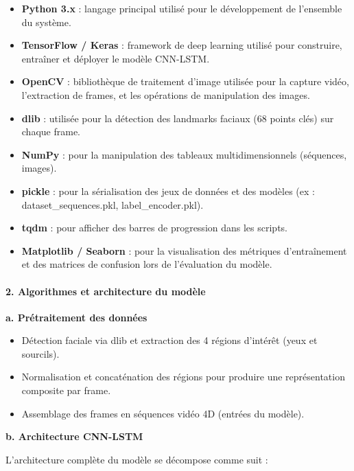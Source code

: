 \documentclass[
]{article}
\begin{document}
\begin{itemize}
\item
  \textbf{Python 3.x} : langage principal utilisé pour le développement de l'ensemble du système.
\item
  \textbf{TensorFlow / Keras} : framework de deep learning utilisé pour construire, entraîner et déployer le modèle CNN-LSTM.
\item
  \textbf{OpenCV} : bibliothèque de traitement d'image utilisée pour la capture vidéo, l'extraction de frames, et les opérations de manipulation des images.
\item
  \textbf{dlib} : utilisée pour la détection des landmarks faciaux (68 points clés) sur chaque frame.
\item
  \textbf{NumPy} : pour la manipulation des tableaux multidimensionnels (séquences, images).
\item
  \textbf{pickle} : pour la sérialisation des jeux de données et des modèles (ex : dataset\_sequences.pkl, label\_encoder.pkl).
\item
  \textbf{tqdm} : pour afficher des barres de progression dans les scripts.
\item
  \textbf{Matplotlib / Seaborn} : pour la visualisation des métriques d'entraînement et des matrices de confusion lors de l'évaluation du modèle.
\end{itemize}

\hypertarget{algorithmes-et-architecture-du-moduxe8le}{%
\paragraph{\texorpdfstring{\textbf{2. Algorithmes et architecture du modèle}}{2. Algorithmes et architecture du modèle}}\label{algorithmes-et-architecture-du-moduxe8le}}

\textbf{a. Prétraitement des données}

\begin{itemize}
\item
  Détection faciale via dlib et extraction des 4 régions d'intérêt (yeux et sourcils).
\item
  Normalisation et concaténation des régions pour produire une représentation composite par frame.
\item
  Assemblage des frames en séquences vidéo 4D (entrées du modèle).
\end{itemize}

\textbf{b. Architecture CNN-LSTM}

L'architecture complète du modèle se décompose comme suit :
\end{document}
